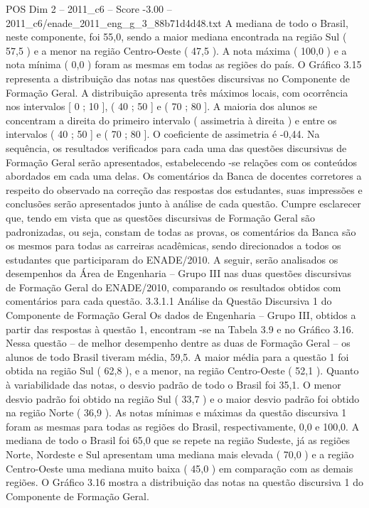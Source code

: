 \begin{textsample}{POS Dim 2 – 2011\_c6 – Score -3.00 – 2011\_c6/enade\_2011\_eng\_g\_3\_88b71d4d48.txt}
A mediana de todo o Brasil, neste componente, foi 55,0, sendo a maior mediana encontrada na região Sul ( 57,5 ) e a menor na região Centro-Oeste ( 47,5 ).
A nota máxima ( 100,0 ) e a nota mínima ( 0,0 ) foram as mesmas em todas as regiões do país.
O Gráfico 3.15 representa a distribuição das notas nas questões discursivas no Componente de Formação Geral.
A distribuição apresenta três máximos locais, com ocorrência nos intervalos [ 0 ; 10 ], ( 40 ; 50 ] e ( 70 ; 80 ].
A maioria dos alunos se concentram a direita do primeiro intervalo ( assimetria à direita ) e entre os intervalos ( 40 ; 50 ] e ( 70 ; 80 ].
O coeficiente de assimetria é -0,44.
Na sequência, os resultados verificados para cada uma das questões discursivas de Formação Geral serão apresentados, estabelecendo -se relações com os conteúdos abordados em cada uma delas.
Os comentários da Banca de docentes corretores a respeito do observado na correção das respostas dos estudantes, suas impressões e conclusões serão apresentados junto à análise de cada questão.
Cumpre esclarecer que, tendo em vista que as questões discursivas de Formação Geral são padronizadas, ou seja, constam de todas as provas, os comentários da Banca são os mesmos para todas as carreiras acadêmicas, sendo direcionados a todos os estudantes que participaram do ENADE/2010.
A seguir, serão analisados os desempenhos da Área de Engenharia – Grupo III nas duas questões discursivas de Formação Geral do ENADE/2010, comparando os resultados obtidos com comentários para cada questão. 3.3.1.1 Análise da Questão Discursiva 1 do Componente de Formação Geral Os dados de Engenharia – Grupo III, obtidos a partir das respostas à questão 1, encontram -se na Tabela 3.9 e no Gráfico 3.16.
Nessa questão – de melhor desempenho dentre as duas de Formação Geral – os alunos de todo Brasil tiveram média, 59,5.
A maior média para a questão 1 foi obtida na região Sul ( 62,8 ), e a menor, na região Centro-Oeste ( 52,1 ).
Quanto à variabilidade das notas, o desvio padrão de todo o Brasil foi 35,1.
O menor desvio padrão foi obtido na região Sul ( 33,7 ) e o maior desvio padrão foi obtido na região Norte ( 36,9 ).
As notas mínimas e máximas da questão discursiva 1 foram as mesmas para todas as regiões do Brasil, respectivamente, 0,0 e 100,0.
A mediana de todo o Brasil foi 65,0 que se repete na região Sudeste, já as regiões Norte, Nordeste e Sul apresentam uma mediana mais elevada ( 70,0 ) e a região Centro-Oeste uma mediana muito baixa ( 45,0 ) em comparação com as demais regiões.
O Gráfico 3.16 mostra a distribuição das notas na questão discursiva 1 do Componente de Formação Geral.

\end{textsample}
